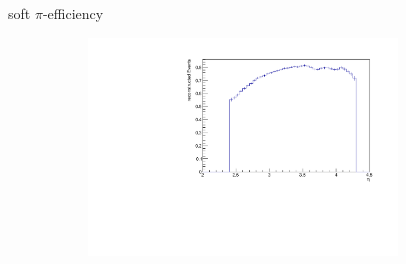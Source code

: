 \documentclass[11pt]{beamer}
\begin{document}
\begin{frame}{soft $\pi$-efficiency}
\begin{figure}
\begin{subfigure}{0.45\textwidth}
\end{subfigure}
\begin{subfigure}{0.45\textwidth}
\includegraphics[width=0.9\textwidth]{up_pdf/tot/h_eta_reco_SPi.pdf}
\end{subfigure}
\end{figure}
\end{frame}
\end{document}
